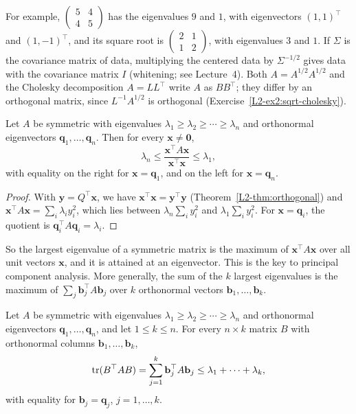 For example, $\begin{pmatrix} 5 & 4 \\ 4 & 5 \end{pmatrix}$ has the eigenvalues $9$ and $1$, with eigenvectors $(1, 1)^\top$ and $(1, -1)^\top$, and its square root is $\begin{pmatrix} 2 & 1 \\ 1 & 2 \end{pmatrix}$, with eigenvalues $3$ and $1$. If $\Sigma$ is the covariance matrix of data, multiplying the centered data by $\Sigma^{-1/2}$ gives data with the covariance matrix $I$ (whitening; see Lecture~4). Both $A = A^{1/2}A^{1/2}$ and the Cholesky decomposition $A = LL^\top$ write $A$ as $BB^\top$; they differ by an orthogonal matrix, since $L^{-1}A^{1/2}$ is orthogonal (Exercise~\ref{L2-ex2:sqrt-cholesky}).

\begin{proposition}\label{L2-prop:rayleigh}
    Let $A$ be symmetric with eigenvalues $\lambda_1 \geq \lambda_2 \geq \cdots \geq \lambda_n$ and orthonormal eigenvectors $\mathbf{q}_1, \ldots, \mathbf{q}_n$. Then for every $\mathbf{x} \neq \mathbf{0}$,
    \[\lambda_n \leq \frac{\mathbf{x}^\top A \mathbf{x}}{\mathbf{x}^\top \mathbf{x}} \leq \lambda_1,\]
    with equality on the right for $\mathbf{x} = \mathbf{q}_1$, and on the left for $\mathbf{x} = \mathbf{q}_n$.
\end{proposition}

\begin{proof}
    With $\mathbf{y} = Q^\top \mathbf{x}$, we have $\mathbf{x}^\top \mathbf{x} = \mathbf{y}^\top \mathbf{y}$ (Theorem~\ref{L2-thm:orthogonal}) and $\mathbf{x}^\top A \mathbf{x} = \sum_i \lambda_i y_i^2$, which lies between $\lambda_n \sum_i y_i^2$ and $\lambda_1 \sum_i y_i^2$. For $\mathbf{x} = \mathbf{q}_i$, the quotient is $\mathbf{q}_i^\top A \mathbf{q}_i = \lambda_i$.
\end{proof}

So the largest eigenvalue of a symmetric matrix is the maximum of $\mathbf{x}^\top A \mathbf{x}$ over all unit vectors $\mathbf{x}$, and it is attained at an eigenvector. This is the key to principal component analysis. More generally, the sum of the $k$ largest eigenvalues is the maximum of $\sum_j \mathbf{b}_j^\top A\mathbf{b}_j$ over $k$ orthonormal vectors $\mathbf{b}_1, \ldots, \mathbf{b}_k$.

\begin{proposition}[Ky Fan]\label{L2-prop:ky-fan}
    Let $A$ be symmetric with eigenvalues $\lambda_1 \geq \lambda_2 \geq \cdots \geq \lambda_n$ and orthonormal eigenvectors $\mathbf{q}_1, \ldots, \mathbf{q}_n$, and let $1 \leq k \leq n$. For every $n \times k$ matrix $B$ with orthonormal columns $\mathbf{b}_1, \ldots, \mathbf{b}_k$,
    \[\operatorname{tr}(B^\top AB) = \sum_{j=1}^k \mathbf{b}_j^\top A\mathbf{b}_j \leq \lambda_1 + \cdots + \lambda_k,\]
    with equality for $\mathbf{b}_j = \mathbf{q}_j$, $j = 1, \ldots, k$.
\end{proposition}


